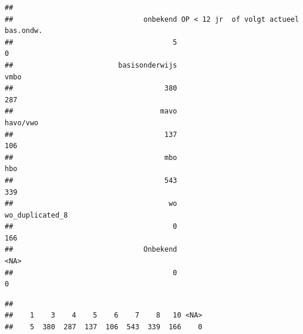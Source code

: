 \documentclass[
]{book}
\newenvironment{Shaded}{\begin{snugshade}}{\end{snugshade}}
\newcommand{\CommentTok}[1]{\textcolor[rgb]{0.56,0.35,0.01}{\textit{#1}}}
\newcommand{\DataTypeTok}[1]{\textcolor[rgb]{0.13,0.29,0.53}{#1}}
\newcommand{\KeywordTok}[1]{\textcolor[rgb]{0.13,0.29,0.53}{\textbf{#1}}}
\newcommand{\NormalTok}[1]{#1}
\newcommand{\OperatorTok}[1]{\textcolor[rgb]{0.81,0.36,0.00}{\textbf{#1}}}
\newcommand{\StringTok}[1]{\textcolor[rgb]{0.31,0.60,0.02}{#1}}
\begin{document}
\begin{Shaded}
\end{Shaded}

\begin{verbatim}
## 
##                               onbekend OP < 12 jr  of volgt actueel bas.ondw. 
##                                      5                                      0 
##                         basisonderwijs                                   vmbo 
##                                    380                                    287 
##                                   mavo                               havo/vwo 
##                                    137                                    106 
##                                    mbo                                    hbo 
##                                    543                                    339 
##                                     wo                        wo_duplicated_8 
##                                      0                                    166 
##                               Onbekend                                   <NA> 
##                                      0                                      0
\end{verbatim}

\begin{Shaded}
\end{Shaded}

\begin{verbatim}
## 
##    1    3    4    5    6    7    8   10 <NA> 
##    5  380  287  137  106  543  339  166    0
\end{verbatim}
\end{document}
